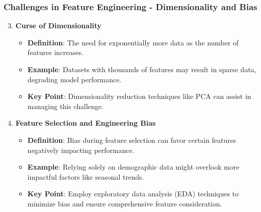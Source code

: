 \documentclass[aspectratio=169]{beamer}
\begin{document}
\begin{frame}[fragile]
    \frametitle{Challenges in Feature Engineering - Dimensionality and Bias}
    
    \begin{enumerate}
        \setcounter{enumi}{2} %
        
        \item \textbf{Curse of Dimensionality}
            \begin{itemize}
                \item \textbf{Definition}: The need for exponentially more data as the number of features increases.
                \item \textbf{Example}: Datasets with thousands of features may result in sparse data, degrading model performance.
                \item \textbf{Key Point}: Dimensionality reduction techniques like PCA can assist in managing this challenge.
            \end{itemize}
        
        \item \textbf{Feature Selection and Engineering Bias}
            \begin{itemize}
                \item \textbf{Definition}: Bias during feature selection can favor certain features negatively impacting performance.
                \item \textbf{Example}: Relying solely on demographic data might overlook more impactful factors like seasonal trends.
                \item \textbf{Key Point}: Employ exploratory data analysis (EDA) techniques to minimize bias and ensure comprehensive feature consideration.
            \end{itemize}
    \end{enumerate}
\end{frame}
\end{document}
